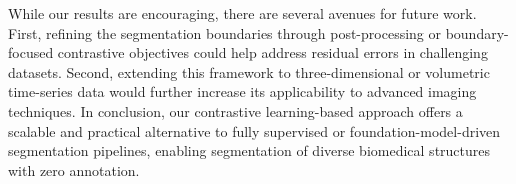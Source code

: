 \documentclass[./dissertation.tex]{subfiles}
\begin{document}
While our results are encouraging, there are several avenues for future work. First, refining the segmentation boundaries through post-processing or boundary-focused contrastive objectives could help address residual errors in challenging datasets. Second, extending this framework to three-dimensional or volumetric time-series data would further increase its applicability to advanced imaging techniques. In conclusion, our contrastive learning-based approach offers a scalable and practical alternative to fully supervised or foundation-model-driven segmentation pipelines, enabling segmentation of diverse biomedical structures with zero annotation.
\end{document}
